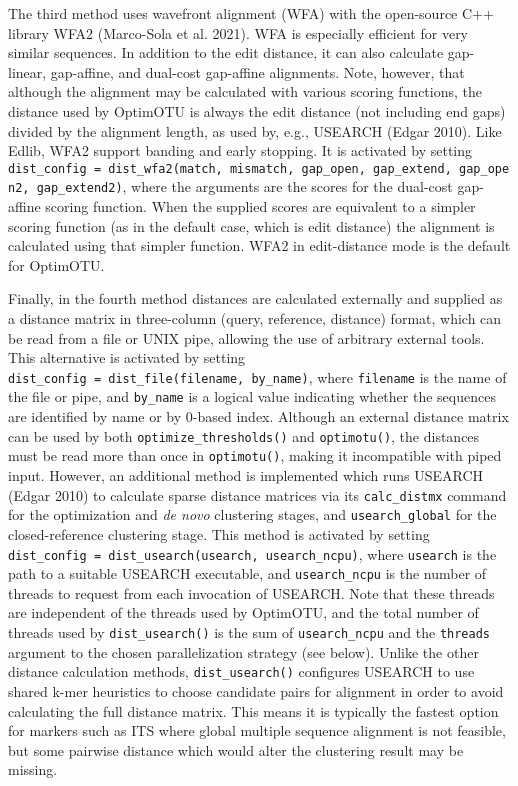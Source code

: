 \documentclass[
]{article}
\begin{document}
The third method uses wavefront alignment (WFA) with the open-source C++ library WFA2 (Marco-Sola et al. 2021).
WFA is especially efficient for very similar sequences.
In addition to the edit distance, it can also calculate gap-linear, gap-affine, and dual-cost gap-affine alignments.
Note, however, that although the alignment may be calculated with various scoring functions, the distance used by OptimOTU is always the edit distance (not including end gaps) divided by the alignment length, as used by, e.g., USEARCH (Edgar 2010).
Like Edlib, WFA2 support banding and early stopping.
It is activated by setting \texttt{dist\_config\ =\ dist\_wfa2(match,\ mismatch,\ gap\_open,\ gap\_extend,\ gap\_open2,\ gap\_extend2)}, where the arguments are the scores for the dual-cost gap-affine scoring function.
When the supplied scores are equivalent to a simpler scoring function (as in the default case, which is edit distance) the alignment is calculated using that simpler function.
WFA2 in edit-distance mode is the default for OptimOTU.

Finally, in the fourth method distances are calculated externally and supplied as a distance matrix in three-column (query, reference, distance) format, which can be read from a file or UNIX pipe, allowing the use of arbitrary external tools.
This alternative is activated by setting \texttt{dist\_config\ =\ dist\_file(filename,\ by\_name)}, where \texttt{filename} is the name of the file or pipe, and \texttt{by\_name} is a logical value indicating whether the sequences are identified by name or by 0-based index.
Although an external distance matrix can be used by both \texttt{optimize\_thresholds()} and \texttt{optimotu()}, the distances must be read more than once in \texttt{optimotu()}, making it incompatible with piped input.
However, an additional method is implemented which runs USEARCH (Edgar 2010) to calculate sparse distance matrices via its \texttt{calc\_distmx} command for the optimization and \emph{de novo} clustering stages, and \texttt{usearch\_global} for the closed-reference clustering stage.
This method is activated by setting \texttt{dist\_config\ =\ dist\_usearch(usearch,\ usearch\_ncpu)}, where \texttt{usearch} is the path to a suitable USEARCH executable, and \texttt{usearch\_ncpu} is the number of threads to request from each invocation of USEARCH.
Note that these threads are independent of the threads used by OptimOTU, and the total number of threads used by \texttt{dist\_usearch()} is the sum of \texttt{usearch\_ncpu} and the \texttt{threads} argument to the chosen parallelization strategy (see below).
Unlike the other distance calculation methods, \texttt{dist\_usearch()} configures USEARCH to use shared k-mer heuristics to choose candidate pairs for alignment in order to avoid calculating the full distance matrix.
This means it is typically the fastest option for markers such as ITS where global multiple sequence alignment is not feasible, but some pairwise distance which would alter the clustering result may be missing.
\end{document}
